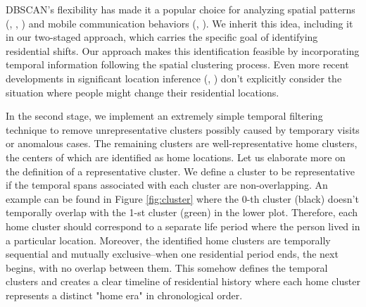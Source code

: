 DBSCAN's flexibility has made it a popular choice for analyzing spatial patterns (\cite{yang2014identifying}, \cite{shi2014density}, \cite{dominguez2017sensing}) and mobile communication behaviors (\cite{karahoca2006comparing}, \cite{jabbar2020fraud}). We inherit this idea, including it in our two-staged approach, which carries the specific goal of identifying residential shifts. Our approach makes this identification feasible by incorporating temporal information following the spatial clustering process. Even more recent developments in significant location inference (\cite{tongsinoot2017exploring}, \cite{luo2020research}) don't explicitly consider the situation where people might change their residential locations.


In the second stage, we implement an extremely simple temporal filtering technique to remove unrepresentative clusters possibly caused by temporary visits or anomalous cases. The remaining clusters are well-representative home clusters, the centers of which are identified as home locations. Let us elaborate more on the definition of a representative cluster. We define a cluster to be representative if the temporal spans associated with each cluster are non-overlapping. An example can be found in Figure \ref{fig:cluster} where the 0-th cluster (black) doesn't temporally overlap with the 1-st cluster (green) in the lower plot. Therefore, each home cluster should correspond to a separate life period where the person lived in a particular location. Moreover, the identified home clusters are temporally sequential and mutually exclusive--when one residential period ends, the next begins, with no overlap between them. This somehow defines the temporal clusters and creates a clear timeline of residential history where each home cluster represents a distinct "home era" in chronological order.

